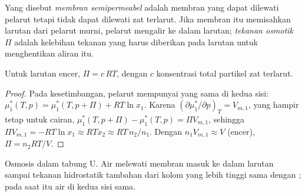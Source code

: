 \begin{definition}\label{def:b2:chemical-potential:osmotic-pressure}
Yang disebut \emph{membran semipermeabel}
adalah membran yang dapat dilewati pelarut tetapi tidak dapat dilewati zat
terlarut. Jika membran itu memisahkan larutan dari pelarut murni, pelarut
mengalir ke dalam larutan; \emph{tekanan osmotik}
$\Pi$ adalah kelebihan tekanan yang harus diberikan pada larutan untuk
menghentikan aliran itu.
\end{definition}

\begin{theorem}\label{thm:b2:chemical-potential:osmosis}
Untuk larutan encer, $\Pi = c\,RT$, dengan $c$ konsentrasi total partikel
zat terlarut.
\end{theorem}

\begin{proof}
Pada kesetimbangan, pelarut mempunyai  yang sama di kedua
sisi: $\mu_1^*(T, p) = \mu_1^*(T, p + \Pi) + RT\ln x_1$. Karena
$(\partial\mu_1^*/
\partial p)_T = V_{m,1}$, yang hampir tetap untuk
cairan, $\mu_1^*(T, p + \Pi) -
\mu_1^*(T, p) = \Pi V_{m,1}$, sehingga
$\Pi V_{m,1} = -RT\ln x_1 \approx RT x_2
\approx RT\,n_2/n_1$. Dengan
$n_1V_{m,1} \approx V$ (encer), $\Pi = n_2RT/V$.
\end{proof}

\begin{omfigure}

{\small Osmosis dalam tabung U. Air melewati membran masuk ke dalam
larutan sampai tekanan hidrostatik tambahan dari kolom yang lebih tinggi
sama dengan ; pada saat itu  air di kedua
sisi sama.}
\end{omfigure}

